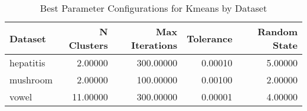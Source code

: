 \begin{table*}[ht!]
\caption{Best Parameter Configurations for Kmeans by Dataset}
\label{tab:best_configs_kmeans_config}
\begin{tabular}{lrrrr}
Dataset & N Clusters & Max Iterations & Tolerance & Random State \\\midrule

hepatitis & 2.00000 & 300.00000 & 0.00010 & 5.00000 \\
mushroom & 2.00000 & 100.00000 & 0.00100 & 2.00000 \\
vowel & 11.00000 & 300.00000 & 0.00001 & 4.00000 \\
\end{tabular}
\end{table*}
